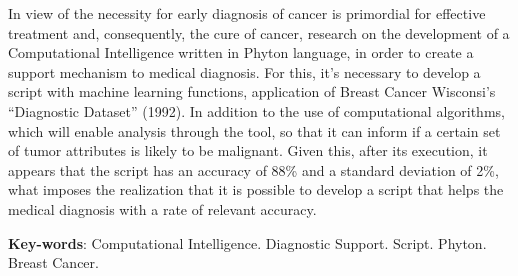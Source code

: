 In view of the necessity for early diagnosis of cancer is primordial for effective treatment and, 
consequently, 
the cure of cancer, 
research on the development of a Computational Intelligence written in Phyton language, 
in order to create a support mechanism to medical diagnosis. 
For this, 
it’s necessary to develop a script with machine learning functions, 
application of Breast Cancer Wisconsi's “Diagnostic Dataset” (1992). 
In addition to the use of computational algorithms, 
which will enable analysis through the tool, 
so that it can inform if a certain set of tumor attributes is likely to be malignant. 
Given this, after its execution, it appears that the script has an accuracy of 88\% and a standard deviation of 2\%, 
what imposes the realization that it is possible to develop a script that helps the medical diagnosis with a rate of relevant accuracy.
\vspace{\onelineskip}

\noindent 
\textbf{Key-words}: Computational Intelligence. Diagnostic Support. Script. Phyton. Breast Cancer.
